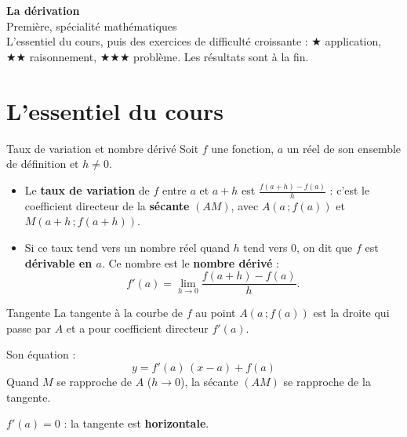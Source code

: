 \documentclass[11pt,a4paper]{article}
\begin{document}
\begin{center}
  {\LARGE\bfseries\color{bleu} La dérivation}\\[4pt]
  {\small Première, spécialité mathématiques}\\[2pt]
  {\small L'essentiel du cours, puis des exercices de difficulté croissante :
  {\color{orange}$\bigstar$} application, {\color{orange}$\bigstar\bigstar$} raisonnement, {\color{orange}$\bigstar\bigstar\bigstar$} problème.
  Les résultats sont à la fin.}
\end{center}

\section{L'essentiel du cours}

\begin{cours}{Taux de variation et nombre dérivé}
Soit $f$ une fonction, $a$ un réel de son ensemble de définition et $h \neq 0$.
\begin{itemize}
  \item Le \textbf{taux de variation} de $f$ entre $a$ et $a+h$ est
  $\displaystyle \frac{f(a+h)-f(a)}{h}$ : c'est le coefficient directeur de la \textbf{sécante} $(AM)$, avec $A(a\,;f(a))$ et $M(a+h\,;f(a+h))$.
  \item Si ce taux tend vers un nombre réel quand $h$ tend vers 0, on dit que $f$ est \textbf{dérivable en $a$}. Ce nombre est le \textbf{nombre dérivé} :
  \[ f'(a) = \lim_{h \to 0} \frac{f(a+h)-f(a)}{h}. \]
\end{itemize}
\end{cours}

\begin{minipage}{0.52\linewidth}
\begin{cours}{Tangente}
La tangente à la courbe de $f$ au point $A(a\,;f(a))$ est la droite qui passe par $A$ et a pour coefficient directeur $f'(a)$.

Son équation :
\[ \boxed{\,y = f'(a)\,(x-a) + f(a)\,} \]
Quand $M$ se rapproche de $A$ ($h \to 0$), la sécante $(AM)$ se rapproche de la tangente.

$f'(a) = 0$ : la tangente est \textbf{horizontale}.
\end{cours}
\end{minipage}\hfill
\begin{minipage}{0.44\linewidth}
\centering
{}
\end{minipage}
\end{document}
